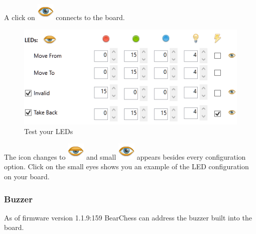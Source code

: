 \documentclass[11pt,a4paper]{article}
\begin{document}
A click on \includegraphics[scale=0.4]{eye.png} connects to the board.

\begin{figure}[H]
	\centering
	\includegraphics[scale=1.0]{iChessOne6.png}
	\caption{Test your LEDs }
	\label{fig:iChessOne9}
\end{figure}
The icon changes to \includegraphics[scale=0.4]{eye_half.png} and small \includegraphics[scale=0.3]{eye.png} appears besides every configuration option. Click on the small eyes shows you an example of the LED configuration on your board.

\subsubsection{Buzzer}
As of firmware version 1.1.9:159 BearChess can address the buzzer built into the board.
\end{document}

